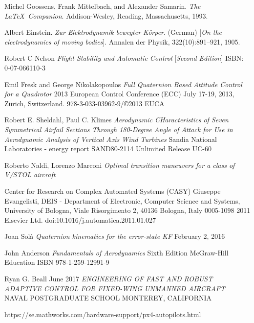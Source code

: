 \documentclass{article}
\begin{document}
\newpage

\begin{thebibliography}{9}
Michel Goossens, Frank Mittelbach, and Alexander Samarin. 
\textit{The \LaTeX\ Companion}. 
Addison-Wesley, Reading, Massachusetts, 1993.

Albert Einstein. 
\textit{Zur Elektrodynamik bewegter K{\"o}rper}. (German) 
[\textit{On the electrodynamics of moving bodies}]. 
Annalen der Physik, 322(10):891–921, 1905.

Robert C Nelson
\textit{Flight Stability and Automatic Control}
[\textit{Second Edition}]
ISBN: 0-07-066110-3

Emil Fresk and George Nikolakopoulos
\textit{Full Quaternion Based Attitude Control for a Quadrotor}
2013 European Control Conference (ECC)
July 17-19, 2013, Zürich, Switzerland.
978-3-033-03962-9/©2013 EUCA

Robert E. Sheldahl, Paul C. Klimes
\textit{Aerodynamic CHaracteristics of Seven Symmetrical Airfoil Sections Through 180-Degree Angle of Attack for Use in Aerodynamic Analysis of Vertical Axis Wind Turbines}
Sandia National Laboratories - energy report
SAND80-2114 Unlimited Release UC-60

Roberto Naldi, Lorenzo Marconi
\textit{Optimal transition maneuvers for a class of V/STOL aircraft}

Center for Research on Complex Automated Systems (CASY) Giuseppe Evangelisti, DEIS - Department of Electronic, Computer Science and Systems, University of Bologna, Viale
Risorgimento 2, 40136 Bologna, Italy
0005-1098 
2011 Elsevier Ltd.
doi:10.1016/j.automatica.2011.01.027

Joan Sol\`{a}
\textit{Quaternion kinematics for the error-state KF}
February 2, 2016

John Anderson
\textit{Fundamentals of Aerodynamics}
Sixth Edition
McGraw-Hill Education
ISBN 978-1-259-12991-9

Ryan G. Beall
June 2017
\textit{ENGINEERING OF FAST AND ROBUST ADAPTIVE
CONTROL FOR FIXED-WING UNMANNED AIRCRAFT}
NAVAL POSTGRADUATE SCHOOL MONTEREY, CALIFORNIA

https://se.mathworks.com/hardware-support/px4-autopilots.html


\end{thebibliography}
\end{document}
